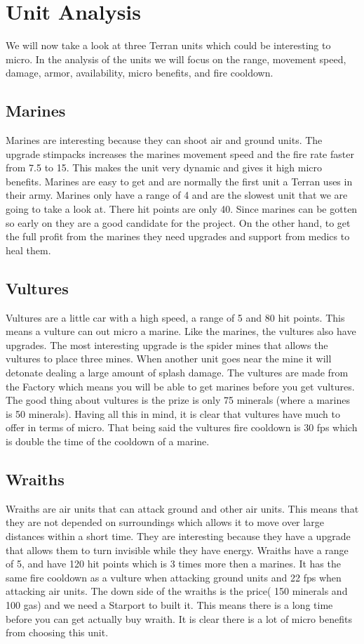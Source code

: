 \section{Unit Analysis}
We will now take a look at three Terran units which could be interesting to micro. In the analysis of the units we will
focus on the range, movement speed, damage, armor, availability, micro benefits, and fire cooldown. 

\subsection{Marines}
Marines are interesting because they can shoot air and ground units. The upgrade stimpacks increases the marines movement speed and the fire rate
faster from 7.5 to 15. This makes the unit very dynamic and gives it high micro benefits. Marines are easy to get and are normally the first unit a Terran uses in
their army. Marines only have a range of 4 and are the slowest unit that we are going to take a look at. There
hit points are only 40. Since marines can be gotten so early on they are a good candidate for the project. On the other hand, to get the full profit from the
marines they need upgrades and support from medics to heal them. 

\subsection{Vultures}
Vultures are a little car with a high speed, a range of 5 and 80 hit points. This means a vulture can out micro a marine. Like the marines, the
vultures also have upgrades. The most interesting upgrade is the spider mines that allows the vultures to place three mines. When another unit goes near the mine it will detonate dealing a large amount of splash damage. The vultures are made
from the Factory which means you will be able to get marines before you get vultures. The good thing about vultures is the prize is only 75 minerals (where
a marines is 50 minerals). Having all this in mind, it is clear that vultures have much to offer in terms of micro.
That being said the vultures fire cooldown is 30 fps which is double the time of the cooldown of a marine.\cite{wiki_vulture}

\subsection{Wraiths}
Wraiths are air units that can attack ground and other air units. This means that they are not depended on surroundings which allows it
to move over large distances within a short time. They are interesting because they have a upgrade that allows them to turn invisible while they have energy. Wraiths 
have a range of 5, and have 120 hit points which is 3 times more then a marines. It has the same fire cooldown
as a vulture when attacking ground units and 22 fps when attacking air units.  
The down side of the wraiths is the price( 150 minerals and 100 gas) and we need a Starport to built it. This means
there is a long time before you can get actually buy wraith. It is clear there is a lot of micro benefits from choosing this unit. 


